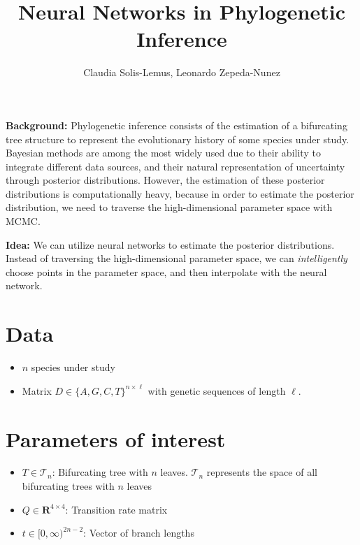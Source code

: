 \documentclass[]{article}
\title{Neural Networks in Phylogenetic Inference}
\author{Claudia Solis-Lemus, Leonardo Zepeda-Nunez}
\date{}
\providecommand{\tightlist}{%
  \setlength{\itemsep}{0pt}\setlength{\parskip}{0pt}}
\begin{document}
\maketitle

\textbf{Background:} Phylogenetic inference consists of the estimation
of a bifurcating tree structure to represent the evolutionary history of
some species under study. Bayesian methods are among the most widely
used due to their ability to integrate different data sources, and their
natural representation of uncertainty through posterior distributions.
However, the estimation of these posterior distributions is
computationally heavy, because in order to estimate the posterior
distribution, we need to traverse the high-dimensional parameter space
with MCMC.

\textbf{Idea:} We can utilize neural networks to estimate the posterior
distributions. Instead of traversing the high-dimensional parameter
space, we can \emph{intelligently} choose points in the parameter space,
and then interpolate with the neural network.

\hypertarget{data}{%
\section{Data}\label{data}}

\begin{itemize}
\tightlist
\item
  \(n\) species under study
\item
  Matrix \(D \in \{A,G,C,T\}^{n \times \ell}\) with genetic sequences of
  length \(\ell\).
\end{itemize}

\hypertarget{parameters-of-interest}{%
\section{Parameters of interest}\label{parameters-of-interest}}

\begin{itemize}
\tightlist
\item
  \(T \in \mathcal{T}_n\): Bifurcating tree with \(n\) leaves.
  \(\mathcal{T}_n\) represents the space of all bifurcating trees with
  \(n\) leaves
\item
  \(Q \in \mathbf{R}^{4 \times 4}\): Transition rate matrix
\item
  \(t \in [0,\infty)^{2n-2}\): Vector of branch lengths
\end{itemize}
\end{document}
